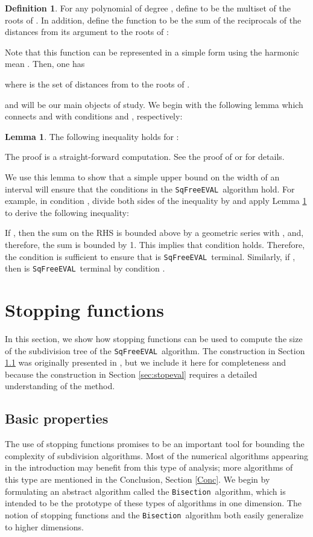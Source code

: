 \documentclass{amsart}
\theoremstyle{definition}
\newtheorem{definition}{Definition}[section]
\newtheorem{lemma}{Lemma}[section]
\newcommand{\EVAL}{\texttt{SqFreeEVAL}}
\newcommand{\GEN}{\texttt{Bisection}}
\begin{document}
\begin{definition}
For any polynomial  of degree , define  to be the multiset of the roots of . In addition, define the function  to be the sum of the reciprocals of the distances from its argument to the roots of :

Note that this function can be represented in a simple form using the harmonic mean .  Then, one has

where  is the set of distances from  to the roots of .
\end{definition}
 and  will be our main objects of study.  We begin with the following lemma which connects  and  with conditions  and , respectively:
\begin{lemma}\label{lem:Sigma}
The following inequality holds for :

The proof is a straight-forward computation.  See the proof of \citep[Lemma 6.2]{Burr-Krahmer-Yap:integral:09} or \citep[Section 5.2]{sagraloff-yap:ceval:09} for details.
\end{lemma}

We use this lemma to show that a simple upper bound on the width of an interval will ensure that the conditions in the \EVAL\ algorithm hold. For example, in condition , divide both sides of the inequality by  and apply Lemma \ref{lem:Sigma} to derive the following inequality:

If , then the sum on the RHS is bounded above by a geometric series with , and, therefore, the sum is bounded by 1.  This implies that condition  holds.  Therefore, the condition  is sufficient to ensure that  is \EVAL\ terminal.  Similarly, if , then  is \EVAL\ terminal by condition .

\section{Stopping functions}\label{Sec:Integral}
In this section, we show how stopping functions can be used to compute the size of the subdivision tree of the \EVAL\ algorithm.  The construction in Section \ref{sec:BasicProperties} was originally presented in \citep{Burr-Krahmer-Yap:integral:09}, but we include it here for completeness and because the construction in Section \ref{sec:stopeval} requires a detailed understanding of the method.

\subsection{Basic properties}\label{sec:BasicProperties}
The use of stopping functions promises to be an important tool for bounding the complexity of subdivision algorithms.  Most of the numerical algorithms appearing in the introduction may benefit from this type of analysis; more algorithms of this type are mentioned in the Conclusion, Section \ref{Conc}.  We begin by formulating an abstract algorithm called the \GEN\ algorithm, which is intended to be the prototype of these types of algorithms in one dimension.  The notion of stopping functions and the \GEN\ algorithm both easily generalize to higher dimensions.
\end{document}
